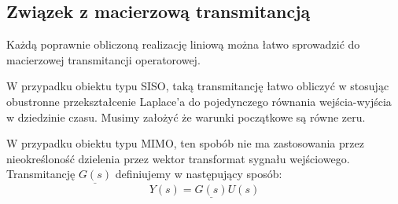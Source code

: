 \documentclass{article}
\begin{document}
	\subsection{Związek z macierzową transmitancją}
		Każdą poprawnie obliczoną realizację liniową można łatwo sprowadzić do
		macierzowej transmitancji operatorowej.

		W przypadku obiektu typu SISO, taką transmitancję łatwo obliczyć w stosując
		obustronne przekształcenie Laplace'a do pojedynczego równania wejścia-wyjścia
		w dziedzinie czasu. Musimy założyć że warunki początkowe są równe zeru.

		W przypadku obiektu typu MIMO, ten spobób nie ma zastosowania przez nieokreśloność
		dzielenia przez wektor transformat sygnału wejściowego.
		Transmitancję $\underline{G(s)}$ definiujemy w następujący sposób:
		\begin{equation}
			Y(s) = \underline{G(s)}U(s)
		\end{equation}
\end{document}
